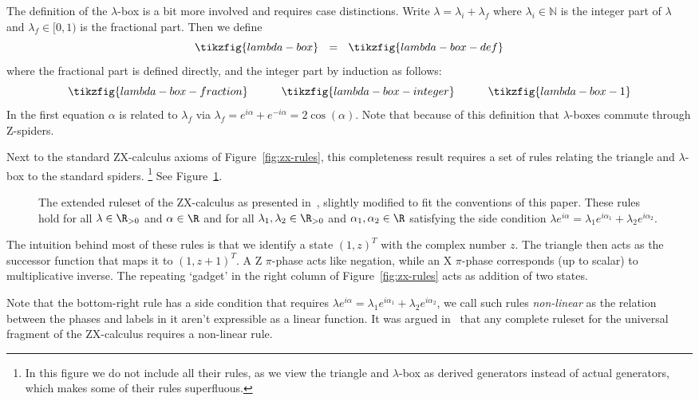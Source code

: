 \documentclass[a4paper,onecolumn,superscriptaddress,11pt,%
				unpublished,%
				allowfontchageintitle,%
				]{quantumarticle}
\begin{document}
The definition of the $\lambda$-box is a bit more involved and requires case distinctions. Write $\lambda = \lambda_i + \lambda_f$ where $\lambda_i\in \mathbb N$ is the integer part of $\lambda$ and $\lambda_f \in [0,1)$ is the fractional part. Then we define
\begin{equation}
	\tikzfig{lambda-box} \ \ = \ \ \tikzfig{lambda-box-def}
\end{equation}
where the fractional part is defined directly, and the integer part by induction as follows:
\begin{equation}
	\tikzfig{lambda-box-fraction} \qquad \quad \tikzfig{lambda-box-integer} \qquad \quad \tikzfig{lambda-box-1}
\end{equation}
In the first equation $\alpha$ is related to $\lambda_f$ via $\lambda_f = e^{i\alpha} + e^{-i\alpha} = 2\cos(\alpha)$. Note that because of this definition that $\lambda$-boxes commute through Z-spiders.

Next to the standard ZX-calculus axioms of Figure~\ref{fig:zx-rules}, this completeness result requires a set of rules relating the triangle and $\lambda$-box to the standard spiders.%
\footnote{In this figure we do not include all their rules, as we view the triangle and $\lambda$-box as derived generators instead of actual generators, which makes some of their rules superfluous.}  
See Figure~\ref{fig:oxford-rules}.

\begin{figure}%
\centering
{}
\caption[Extended rules for ZX-calculus (Oxford)]{%
	The extended ruleset of the ZX-calculus as presented 
	in~\cite{hadzihasanovic2015diagrammatic}, slightly modified to fit the conventions of this paper.
	These rules hold for all $\lambda \in \R_{>0}$ and $\alpha\in \R$ and for all $\lambda_1,\lambda_2\in \R_{>0}$ and $\alpha_1,\alpha_2\in \R$ satisfying the side condition $\lambda e^{i\alpha} = \lambda_1e^{i\alpha_1} + \lambda_2 e^{i\alpha_2}$.
}
\label{fig:oxford-rules}
\end{figure}

The intuition behind most of these rules is that we identify a state $(1, z)^T$ with the complex number $z$. The triangle then acts as the successor function that maps it to $(1,z+1)^T$. A Z $\pi$-phase acts like negation, while an X $\pi$-phase corresponds (up to scalar) to multiplicative inverse. The repeating `gadget' in the right column of Figure~\ref{fig:zx-rules} acts as addition of two states. 

Note that the bottom-right rule has a side condition that requires $\lambda e^{i\alpha} = \lambda_1e^{i\alpha_1} + \lambda_2 e^{i\alpha_2}$, we call such rules \emph{non-linear} as the relation between the phases and labels in it aren't expressible as a linear function. It was argued in~\cite{JPV-universal} that any complete ruleset for the universal fragment of the ZX-calculus requires a non-linear rule.
\end{document}

